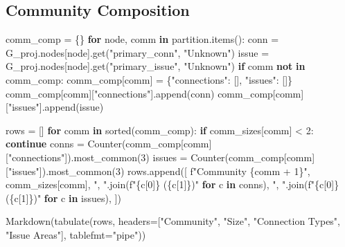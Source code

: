 \documentclass[
  letterpaper,
  DIV=11,
  numbers=noendperiod]{scrartcl}
\newenvironment{Shaded}{\begin{snugshade}}{\end{snugshade}}
\newcommand{\BuiltInTok}[1]{\textcolor[rgb]{0.00,0.23,0.31}{#1}}
\newcommand{\ControlFlowTok}[1]{\textcolor[rgb]{0.00,0.23,0.31}{\textbf{#1}}}
\newcommand{\DecValTok}[1]{\textcolor[rgb]{0.68,0.00,0.00}{#1}}
\newcommand{\KeywordTok}[1]{\textcolor[rgb]{0.00,0.23,0.31}{\textbf{#1}}}
\newcommand{\NormalTok}[1]{\textcolor[rgb]{0.00,0.23,0.31}{#1}}
\newcommand{\OperatorTok}[1]{\textcolor[rgb]{0.37,0.37,0.37}{#1}}
\newcommand{\SpecialCharTok}[1]{\textcolor[rgb]{0.37,0.37,0.37}{#1}}
\newcommand{\SpecialStringTok}[1]{\textcolor[rgb]{0.13,0.47,0.30}{#1}}
\newcommand{\StringTok}[1]{\textcolor[rgb]{0.13,0.47,0.30}{#1}}
\begin{document}
\subsection{Community Composition}\label{community-composition}

\begin{Shaded}
\begin{Highlighting}[]
\NormalTok{comm\_comp }\OperatorTok{=}\NormalTok{ \{\}}
\ControlFlowTok{for}\NormalTok{ node, comm }\KeywordTok{in}\NormalTok{ partition.items():}
\NormalTok{    conn }\OperatorTok{=}\NormalTok{ G\_proj.nodes[node].get(}\StringTok{"primary\_conn"}\NormalTok{, }\StringTok{"Unknown"}\NormalTok{)}
\NormalTok{    issue }\OperatorTok{=}\NormalTok{ G\_proj.nodes[node].get(}\StringTok{"primary\_issue"}\NormalTok{, }\StringTok{"Unknown"}\NormalTok{)}
    \ControlFlowTok{if}\NormalTok{ comm }\KeywordTok{not} \KeywordTok{in}\NormalTok{ comm\_comp:}
\NormalTok{        comm\_comp[comm] }\OperatorTok{=}\NormalTok{ \{}\StringTok{"connections"}\NormalTok{: [], }\StringTok{"issues"}\NormalTok{: []\}}
\NormalTok{    comm\_comp[comm][}\StringTok{"connections"}\NormalTok{].append(conn)}
\NormalTok{    comm\_comp[comm][}\StringTok{"issues"}\NormalTok{].append(issue)}

\NormalTok{rows }\OperatorTok{=}\NormalTok{ []}
\ControlFlowTok{for}\NormalTok{ comm }\KeywordTok{in} \BuiltInTok{sorted}\NormalTok{(comm\_comp):}
    \ControlFlowTok{if}\NormalTok{ comm\_sizes[comm] }\OperatorTok{\textless{}} \DecValTok{2}\NormalTok{:}
        \ControlFlowTok{continue}
\NormalTok{    conns }\OperatorTok{=}\NormalTok{ Counter(comm\_comp[comm][}\StringTok{"connections"}\NormalTok{]).most\_common(}\DecValTok{3}\NormalTok{)}
\NormalTok{    issues }\OperatorTok{=}\NormalTok{ Counter(comm\_comp[comm][}\StringTok{"issues"}\NormalTok{]).most\_common(}\DecValTok{3}\NormalTok{)}
\NormalTok{    rows.append([}
        \SpecialStringTok{f"Community }\SpecialCharTok{\{}\NormalTok{comm }\OperatorTok{+} \DecValTok{1}\SpecialCharTok{\}}\SpecialStringTok{"}\NormalTok{,}
\NormalTok{        comm\_sizes[comm],}
        \StringTok{", "}\NormalTok{.join(}\SpecialStringTok{f"}\SpecialCharTok{\{}\NormalTok{c[}\DecValTok{0}\NormalTok{]}\SpecialCharTok{\}}\SpecialStringTok{ (}\SpecialCharTok{\{}\NormalTok{c[}\DecValTok{1}\NormalTok{]}\SpecialCharTok{\}}\SpecialStringTok{)"} \ControlFlowTok{for}\NormalTok{ c }\KeywordTok{in}\NormalTok{ conns),}
        \StringTok{", "}\NormalTok{.join(}\SpecialStringTok{f"}\SpecialCharTok{\{}\NormalTok{c[}\DecValTok{0}\NormalTok{]}\SpecialCharTok{\}}\SpecialStringTok{ (}\SpecialCharTok{\{}\NormalTok{c[}\DecValTok{1}\NormalTok{]}\SpecialCharTok{\}}\SpecialStringTok{)"} \ControlFlowTok{for}\NormalTok{ c }\KeywordTok{in}\NormalTok{ issues),}
\NormalTok{    ])}

\NormalTok{Markdown(tabulate(rows,}
\NormalTok{                  headers}\OperatorTok{=}\NormalTok{[}\StringTok{"Community"}\NormalTok{, }\StringTok{"Size"}\NormalTok{, }\StringTok{"Connection Types"}\NormalTok{,}
                           \StringTok{"Issue Areas"}\NormalTok{],}
\NormalTok{                  tablefmt}\OperatorTok{=}\StringTok{"pipe"}\NormalTok{))}
\end{Highlighting}
\end{Shaded}
\end{document}
